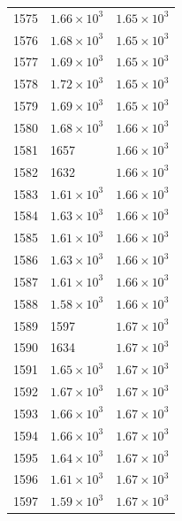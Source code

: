 \begin{table}[H]
\begin{tabular}{lll}
1575 & $\displaystyle 1.66 \times 10^{3}$ & $\displaystyle 1.65 \times 10^{3}$ \\
1576 & $\displaystyle 1.68 \times 10^{3}$ & $\displaystyle 1.65 \times 10^{3}$ \\
1577 & $\displaystyle 1.69 \times 10^{3}$ & $\displaystyle 1.65 \times 10^{3}$ \\
1578 & $\displaystyle 1.72 \times 10^{3}$ & $\displaystyle 1.65 \times 10^{3}$ \\
1579 & $\displaystyle 1.69 \times 10^{3}$ & $\displaystyle 1.65 \times 10^{3}$ \\
1580 & $\displaystyle 1.68 \times 10^{3}$ & $\displaystyle 1.66 \times 10^{3}$ \\
1581 & 1657 & $\displaystyle 1.66 \times 10^{3}$ \\
1582 & 1632 & $\displaystyle 1.66 \times 10^{3}$ \\
1583 & $\displaystyle 1.61 \times 10^{3}$ & $\displaystyle 1.66 \times 10^{3}$ \\
1584 & $\displaystyle 1.63 \times 10^{3}$ & $\displaystyle 1.66 \times 10^{3}$ \\
1585 & $\displaystyle 1.61 \times 10^{3}$ & $\displaystyle 1.66 \times 10^{3}$ \\
1586 & $\displaystyle 1.63 \times 10^{3}$ & $\displaystyle 1.66 \times 10^{3}$ \\
1587 & $\displaystyle 1.61 \times 10^{3}$ & $\displaystyle 1.66 \times 10^{3}$ \\
1588 & $\displaystyle 1.58 \times 10^{3}$ & $\displaystyle 1.66 \times 10^{3}$ \\
1589 & 1597 & $\displaystyle 1.67 \times 10^{3}$ \\
1590 & 1634 & $\displaystyle 1.67 \times 10^{3}$ \\
1591 & $\displaystyle 1.65 \times 10^{3}$ & $\displaystyle 1.67 \times 10^{3}$ \\
1592 & $\displaystyle 1.67 \times 10^{3}$ & $\displaystyle 1.67 \times 10^{3}$ \\
1593 & $\displaystyle 1.66 \times 10^{3}$ & $\displaystyle 1.67 \times 10^{3}$ \\
1594 & $\displaystyle 1.66 \times 10^{3}$ & $\displaystyle 1.67 \times 10^{3}$ \\
1595 & $\displaystyle 1.64 \times 10^{3}$ & $\displaystyle 1.67 \times 10^{3}$ \\
1596 & $\displaystyle 1.61 \times 10^{3}$ & $\displaystyle 1.67 \times 10^{3}$ \\
1597 & $\displaystyle 1.59 \times 10^{3}$ & $\displaystyle 1.67 \times 10^{3}$ \\

\end{tabular}
\end{table}
